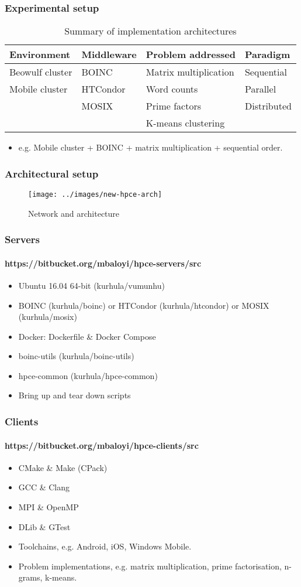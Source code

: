 \documentclass[11pt]{beamer}
\begin{document}
\begin{frame}
\frametitle{Experimental setup}
\begin{table}
	\begin{tabular}{| l | l | l | l |}
		\hline
		\textbf{Environment} & \textbf{Middleware} & \textbf{Problem addressed} & \textbf{Paradigm} \\ 
		\hline \hline
		Beowulf cluster & BOINC & Matrix multiplication &  Sequential \\
		Mobile cluster & HTCondor & Word counts &  Parallel \\
		& MOSIX & Prime factors & Distributed \\
		&  & K-means clustering & \\
		\hline 
	\end{tabular}
	\caption{Summary of implementation architectures}
\end{table}
\begin{itemize}
	\item e.g. Mobile cluster + BOINC + matrix multiplication + sequential order.
\end{itemize}
\end{frame}

\begin{frame}
\frametitle{Architectural setup}
\begin{figure}[h]
	\centering
	\texttt{[image: ../images/new-hpce-arch]}
	\caption{Network and architecture}
	\label{net_arch}
\end{figure}
\end{frame}


\begin{frame}
\frametitle{Servers}
\framesubtitle{https://bitbucket.org/mbaloyi/hpce-servers/src}
\begin{itemize}
	\item Ubuntu 16.04 64-bit (kurhula/vumunhu)
	\item BOINC (kurhula/boinc) or HTCondor (kurhula/htcondor) or MOSIX (kurhula/mosix)
	\item Docker: Dockerfile \& Docker Compose 
	\item boinc-utils (kurhula/boinc-utils)
	\item hpce-common (kurhula/hpce-common)
	\item Bring up and tear down scripts
\end{itemize}
\end{frame}

\begin{frame}
\frametitle{Clients}
\framesubtitle{https://bitbucket.org/mbaloyi/hpce-clients/src}
\begin{itemize}
\item CMake \& Make (CPack)
\item GCC \& Clang
\item MPI \& OpenMP
\item DLib \& GTest
\item Toolchains, e.g. Android, iOS, Windows Mobile.
\item Problem implementations, e.g. matrix multiplication, prime factorisation, n-grams, k-means.
\end{itemize}
\end{frame}
\end{document}
